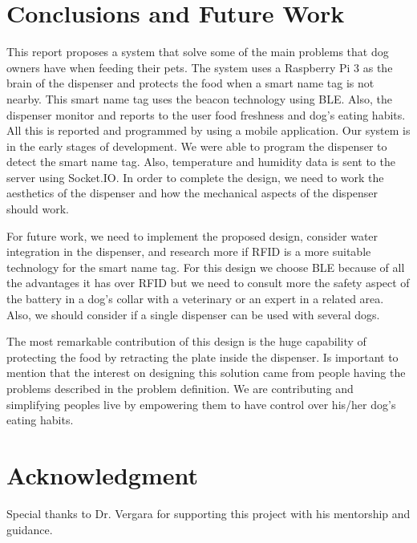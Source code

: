 \documentclass[12pt]{article}
\begin{document}
\section{Conclusions and Future Work}

This report proposes a system that solve some of the main problems that dog owners have when feeding their pets. The system uses a Raspberry Pi 3 as the brain of the dispenser and protects the food when a smart name tag is not nearby. This smart name tag uses the beacon technology using BLE. Also, the dispenser monitor and reports to the user food freshness and dog's eating habits. All this is reported and programmed by using a mobile application. Our system is in the early stages of development. We were able to program the dispenser to detect the smart name tag. Also, temperature and humidity data is sent to the server using Socket.IO. In order to complete the design, we need to work the aesthetics of the dispenser and how the mechanical aspects of the dispenser should work.

For future work, we need to implement the proposed design, consider water integration in the dispenser, and research more if RFID is a more suitable technology for the smart name tag. For this design we choose BLE because of all the advantages it has over RFID but we need to consult more the safety aspect of the battery in a dog's collar with a veterinary or an expert in a related area. Also, we should consider if a single dispenser can be used with several dogs.

The most remarkable contribution of this design is the huge capability of protecting the food by retracting the plate inside the dispenser. Is important to mention that the interest on designing this solution came from people having the problems described in the problem definition. We are contributing and simplifying peoples live by empowering them to have control over his/her dog's eating habits.


\section*{Acknowledgment}

Special thanks to Dr. Vergara for supporting this project with his mentorship and guidance.

\newpage

{}
\end{document}
